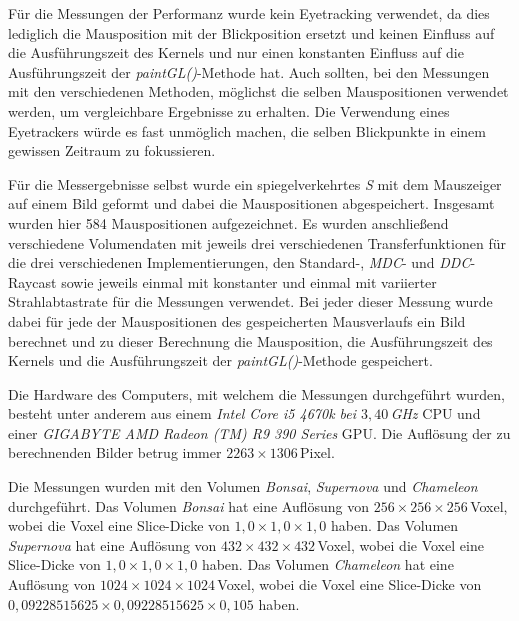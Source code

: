 Für die Messungen der Performanz wurde kein Eyetracking verwendet, da dies lediglich die Mausposition mit der Blickposition ersetzt und keinen Einfluss auf die Ausführungszeit des Kernels und nur einen konstanten Einfluss auf die Ausführungszeit der \emph{paintGL()}-Methode hat.
Auch sollten, bei den Messungen mit den verschiedenen Methoden, möglichst die selben Mauspositionen verwendet werden, um vergleichbare Ergebnisse zu erhalten.
Die Verwendung eines Eyetrackers würde es fast unmöglich machen, die selben Blickpunkte in einem gewissen Zeitraum zu fokussieren.

Für die Messergebnisse selbst wurde ein spiegelverkehrtes \emph{S} mit dem Mauszeiger auf einem Bild geformt und dabei die Mauspositionen abgespeichert.
Insgesamt wurden hier 584 Mauspositionen aufgezeichnet.
Es wurden anschließend verschiedene Volumendaten mit jeweils drei verschiedenen Transferfunktionen für die drei verschiedenen Implementierungen, den Standard-, \emph{MDC}- und \emph{DDC}-Raycast sowie jeweils einmal mit konstanter und einmal mit variierter Strahlabtastrate für die Messungen verwendet.
Bei jeder dieser Messung wurde dabei für jede der Mauspositionen des gespeicherten Mausverlaufs ein Bild berechnet und zu dieser Berechnung die Mausposition, die Ausführungszeit des Kernels und die Ausführungszeit der \emph{paintGL()}-Methode gespeichert.

Die Hardware des Computers, mit welchem die Messungen durchgeführt wurden, besteht unter anderem aus einem \emph{Intel Core i5 4670k bei $3,40$\,GHz} CPU und einer \emph{GIGABYTE AMD Radeon (TM) R9 390 Series} GPU.
Die Auflösung der zu berechnenden Bilder betrug immer $2263\times1306$\,Pixel.

Die Messungen wurden mit den Volumen \emph{Bonsai}, \emph{Supernova} und \emph{Chameleon} durchgeführt.
Das Volumen \emph{Bonsai} hat eine Auflösung von $256\times256\times256$\,Voxel, wobei die Voxel eine Slice-Dicke von $1,0\times1,0\times1,0$ haben.
Das Volumen \emph{Supernova} hat eine Auflösung von $432\times432\times432$\,Voxel, wobei die Voxel eine Slice-Dicke von $1,0\times1,0\times1,0$ haben.
Das Volumen \emph{Chameleon} hat eine Auflösung von $1024\times1024\times1024$\,Voxel, wobei die Voxel eine Slice-Dicke von $0,09228515625\times0,09228515625\times0,105$ haben.

